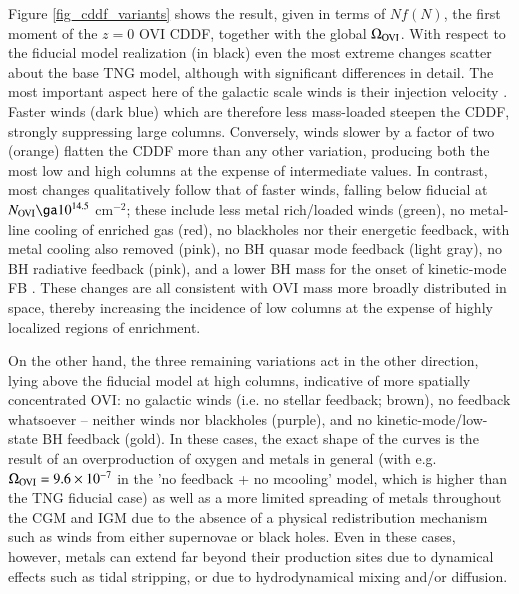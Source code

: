\documentclass[useAMS,usenatbib]{mnras}
\newcommand{\ovi}{OVI\xspace}
\begin{document}
Figure \ref{fig_cddf_variants} shows the result, given in terms of $N f(N)$, the first moment of the $z=0$ \ovi CDDF, together with the global $\Omega_{\rm OVI}$. With respect to the fiducial model realization (in black) even the most extreme changes scatter about the base TNG model, although with significant differences in detail. The most important aspect here of the galactic scale winds is their injection velocity \citep[see Figure B2 of][the impact on late time stellar mass production also being significant]{pillepich17a}. Faster winds (dark blue) which are therefore less mass-loaded steepen the CDDF, strongly suppressing large columns. Conversely, winds slower by a factor of two (orange) flatten the CDDF more than any other variation, producing both the most low and high columns at the expense of intermediate values. In contrast, most changes qualitatively follow that of faster winds, falling below fiducial at $N_{\rm OVI} \ga 10^{14.5}$ cm$^{-2}$; these include less metal rich/loaded winds (green), no metal-line cooling of enriched gas (red), no blackholes nor their energetic feedback, with metal cooling also removed (pink), no BH quasar mode feedback (light gray), no BH radiative feedback (pink), and a lower BH mass for the onset of kinetic-mode FB \citep[light blue; the denominator of Equation 5 in][decreased by a factor of four]{weinberger17}. These changes are all consistent with \ovi mass more broadly distributed in space, thereby increasing the incidence of low columns at the expense of highly localized regions of enrichment.

On the other hand, the three remaining variations act in the other direction, lying above the fiducial model at high columns, indicative of more spatially concentrated \ovi: no galactic winds (i.e. no stellar feedback; brown), no feedback whatsoever -- neither winds nor blackholes (purple), and no kinetic-mode/low-state BH feedback (gold). In these cases, the exact shape of the curves is the result of an overproduction of oxygen and metals in general (with e.g. $\Omega_{\rm OVI} = 9.6 \times 10^{-7}$ in the 'no feedback + no mcooling' model, which is higher than the TNG fiducial case) as well as a more limited spreading of metals throughout the CGM and IGM due to the absence of a physical redistribution mechanism such as winds from either supernovae or black holes. Even in these cases, however, metals can extend far beyond their production sites due to dynamical effects such as tidal stripping, or due to hydrodynamical mixing and/or diffusion.
\end{document}
